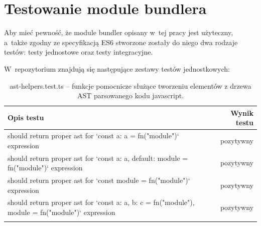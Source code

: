 \documentclass{SGGW-thesis}
\begin{document}
\section{Testowanie module bundlera}
Aby mieć pewność, że module bundler opisany w~tej pracy jest użyteczny, a~także zgodny ze specyfikacją ES6 stworzone zostały do niego dwa rodzaje testów: testy jednostowe oraz testy integracyjne.

W~repozytorium znajdują się następujące zestawy testów jednostkowych:
\setlength\LTleft{0pt}
\setlength\LTright{0pt}
\begin{longtable}{@{\extracolsep{\fill}}|p{}|r|@{} }
    \hline
    \textbf{Opis testu}                                                                                                                                              & \textbf{Wynik testu} \\ \hline
    \endfirsthead
    \endhead
    should return proper ast for `const {a: a} = fn("module")` expression                                   & pozytywny            \\ \hline
    should return proper ast for `const {a: a, default: module} = fn("module")` expression                  & pozytywny            \\ \hline
    should return proper ast for `const module = fn("module")` expression                                   & pozytywny            \\ \hline
    should return proper ast for `const {a: a, b: c} = fn("module"), module = fn("module")` expression      & pozytywny            \\ \hline
    \caption{ast-helpers.test.ts -- funkcje pomocnicze służące tworzeniu elementów z drzewa AST parsowanego kodu javascript.}
\end{longtable}
\end{document}

